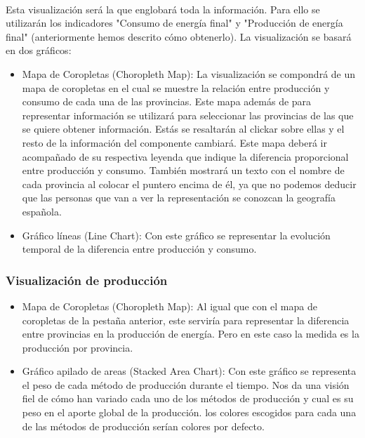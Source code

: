 \documentclass{article}
\begin{document}
				\paragraph{}
				Esta visualización será la que englobará toda la información. Para ello se utilizarán los indicadores "Consumo de energía final" y "Producción de energía final" (anteriormente hemos descrito cómo obtenerlo). La visualización se basará en dos gráficos:
				
				\begin{itemize}
				
					\item Mapa de Coropletas (Choropleth Map): La visualización se compondrá de un mapa de coropletas en el cual se muestre la relación entre producción y consumo de cada una de las provincias. Este mapa además de para representar información se utilizará para seleccionar las provincias de las que se quiere obtener información. Estás se resaltarán al clickar sobre ellas y el resto de la información del componente cambiará. Este mapa deberá ir acompañado de su respectiva leyenda que indique la diferencia proporcional entre producción y consumo. También mostrará un texto con el nombre de cada provincia al colocar el puntero encima de él, ya que no podemos deducir que las personas que van a ver la representación se conozcan la geografía española.
					
					\item Gráfico líneas (Line Chart): Con este gráfico se representar la evolución temporal de la  diferencia entre producción y consumo.
					
				\end{itemize}

			\subsubsection{Visualización de producción}

				\begin{itemize}
				
					\item Mapa de Coropletas (Choropleth Map): Al igual que con el mapa de coropletas de la pestaña anterior, este serviría para representar la diferencia entre provincias en la producción de energía. Pero en este caso la medida es la producción por provincia.
					
					\item Gráfico apilado de areas (Stacked Area Chart): Con este gráfico se representa el peso de cada método de producción durante el tiempo. Nos da una visión fiel de cómo han variado cada uno de los métodos de producción y cual es su peso en el aporte global de la producción. los colores escogidos para cada una de las métodos de producción serían colores por defecto.
					
				\end{itemize}
\end{document}
